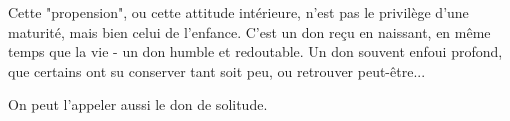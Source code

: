 Cette "propension", ou cette attitude intérieure, n'est pas le privilège d'une maturité, mais bien celui de l'enfance. C'est un don reçu en naissant, en même temps que la vie - un don humble et redoutable. Un don souvent enfoui profond, que certains ont su conserver tant soit peu, ou retrouver peut-être...

On peut l'appeler aussi le don de solitude.








